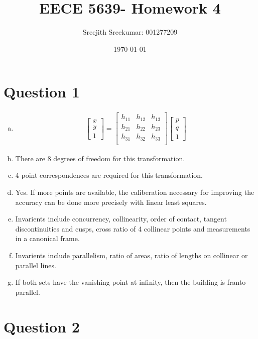 \documentclass{article}
\title{EECE 5639- Homework 4}
\author{Sreejith Sreekumar: 001277209}
\date{\today}
\begin{document}
\maketitle

\section*{Question 1}
\begin{enumerate}[(a)]

\item   
\begin{gather}
 \begin{bmatrix} x \\ y \\ 1  \end{bmatrix}
 =
\begin{bmatrix} 
h_{11} & h_{12} & h_{13}\\
h_{21} & h_{22} & h_{23}\\
h_{31} & h_{32} & h_{33}\\
\end{bmatrix}
 \begin{bmatrix} p \\ q \\ 1  \end{bmatrix}
\end{gather}



  
\item There are 8 degrees of freedom for this transformation.
\item 4 point correspondences are required for this transformation.
\item Yes. If more points are available, the caliberation necessary for improving the
  accuracy can be done more precisely with linear least squares.
\item Invarients include concurrency, collinearity, order of contact, tangent discontinuities and cusps,
  cross ratio of 4 collinear points and measurements in a canonical frame.
\item   Invarients include parallelism, ratio of areas, ratio of lengths on collinear or parallel lines.
\item  If both sets have the vanishing point at infinity, then the building is franto parallel.  
\end{enumerate}

\section*{Question 2}
\end{document}
